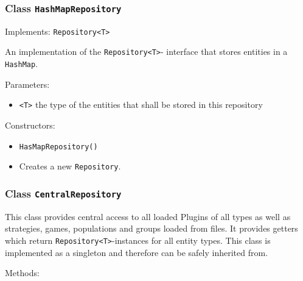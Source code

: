 \documentclass[parskip=full,11pt]{scrartcl}
\begin{document}
\subsubsection{Class \texttt{HashMapRepository}}

Implements: \texttt{Repository<T>}

An implementation of the \texttt{Repository<T>}- interface that stores entities in a \texttt{HashMap}.

Parameters:

\begin{itemize}\itemsep -10pt
	\item \texttt{<T>} the type of the entities that shall be stored in this repository
\end{itemize}

Constructors:

\begin{itemize} \itemsep -10pt
	\item \texttt{HasMapRepository()}
	\item[] Creates a new \texttt{Repository}.
\end{itemize}

\subsubsection{Class \texttt{CentralRepository}}

This class provides central access to all loaded Plugins of all types as well as strategies, games, populations and groups loaded from files. It provides getters which return \texttt{Repository<T>}-instances for all entity types. This class is implemented as a singleton and therefore can be safely inherited from.

Methods:
\end{document}

